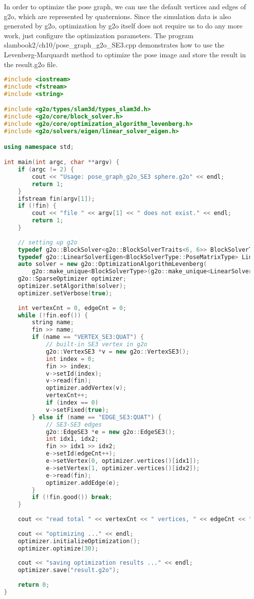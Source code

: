 In order to optimize the pose graph, we can use the default vertices and edges of g2o, which are represented by quaternions. Since the simulation data is also generated by g2o, optimization by g2o itself does not require us to do any more work, just configure the optimization parameters. The program slambook2/ch10/pose\_graph\_g2o\_SE3.cpp demonstrates how to use the Levenberg-Marquardt method to optimize the pose image and store the result in the result.g2o file.

\begin{lstlisting}[language=c++,caption=slambook2/ch10/pose\_graph\_g2o\_SE3.cpp]
#include <iostream>
#include <fstream>
#include <string>

#include <g2o/types/slam3d/types_slam3d.h>
#include <g2o/core/block_solver.h>
#include <g2o/core/optimization_algorithm_levenberg.h>
#include <g2o/solvers/eigen/linear_solver_eigen.h>

using namespace std;

int main(int argc, char **argv) {
	if (argc != 2) {
		cout << "Usage: pose_graph_g2o_SE3 sphere.g2o" << endl;
		return 1;
	}
	ifstream fin(argv[1]);
	if (!fin) {
		cout << "file " << argv[1] << " does not exist." << endl;
		return 1;
	}
	
	// setting up g2o
	typedef g2o::BlockSolver<g2o::BlockSolverTraits<6, 6>> BlockSolverType;
	typedef g2o::LinearSolverEigen<BlockSolverType::PoseMatrixType> LinearSolverType;
	auto solver = new g2o::OptimizationAlgorithmLevenberg(
		g2o::make_unique<BlockSolverType>(g2o::make_unique<LinearSolverType>()));
	g2o::SparseOptimizer optimizer;     
	optimizer.setAlgorithm(solver);   
	optimizer.setVerbose(true);       
	
	int vertexCnt = 0, edgeCnt = 0;
	while (!fin.eof()) {
		string name;
		fin >> name;
		if (name == "VERTEX_SE3:QUAT") {
			// built-in SE3 vertex in g2o
			g2o::VertexSE3 *v = new g2o::VertexSE3();
			int index = 0;
			fin >> index;
			v->setId(index);
			v->read(fin);
			optimizer.addVertex(v);
			vertexCnt++;
			if (index == 0)
			v->setFixed(true);
		} else if (name == "EDGE_SE3:QUAT") {
			// SE3-SE3 edges
			g2o::EdgeSE3 *e = new g2o::EdgeSE3();
			int idx1, idx2;    
			fin >> idx1 >> idx2;
			e->setId(edgeCnt++);
			e->setVertex(0, optimizer.vertices()[idx1]);
			e->setVertex(1, optimizer.vertices()[idx2]);
			e->read(fin);
			optimizer.addEdge(e);
		}
		if (!fin.good()) break;
	}
	
	cout << "read total " << vertexCnt << " vertices, " << edgeCnt << " edges." << endl;
	
	cout << "optimizing ..." << endl;
	optimizer.initializeOptimization();
	optimizer.optimize(30);
	
	cout << "saving optimization results ..." << endl;
	optimizer.save("result.g2o");
	
	return 0;
}
\end{lstlisting}

